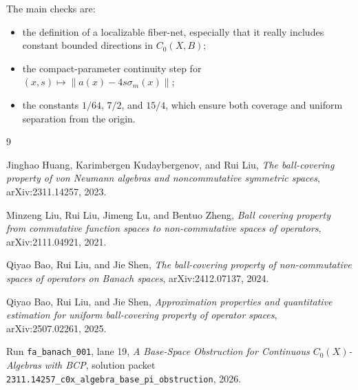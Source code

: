 \documentclass[11pt]{article}
\begin{document}
The main checks are:
\begin{itemize}
    \item the definition of a localizable fiber-net, especially that it really
    includes constant bounded directions in \(C_0(X,B)\);
    \item the compact-parameter continuity step for
    \((x,s)\mapsto\|a(x)-4s\sigma_m(x)\|\);
    \item the constants \(1/64\), \(7/2\), and \(15/4\), which ensure both
    coverage and uniform separation from the origin.
\end{itemize}

\begin{thebibliography}{9}

Jinghao Huang, Karimbergen Kudaybergenov, and Rui Liu,
\emph{The ball-covering property of von Neumann algebras and noncommutative
symmetric spaces},
arXiv:2311.14257, 2023.

Minzeng Liu, Rui Liu, Jimeng Lu, and Bentuo Zheng,
\emph{Ball covering property from commutative function spaces to
non-commutative spaces of operators},
arXiv:2111.04921, 2021.

Qiyao Bao, Rui Liu, and Jie Shen,
\emph{The ball-covering property of non-commutative spaces of operators on
Banach spaces},
arXiv:2412.07137, 2024.

Qiyao Bao, Rui Liu, and Jie Shen,
\emph{Approximation properties and quantitative estimation for uniform
ball-covering property of operator spaces},
arXiv:2507.02261, 2025.

Run \texttt{fa\_banach\_001}, lane 19,
\emph{A Base-Space Obstruction for Continuous \(C_0(X)\)-Algebras with BCP},
solution packet
\texttt{2311.14257\_c0x\_algebra\_base\_pi\_obstruction}, 2026.

\end{thebibliography}
\end{document}
